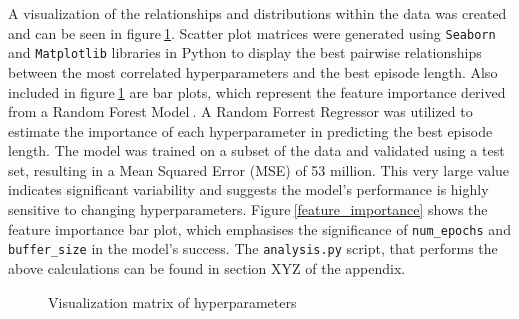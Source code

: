 A visualization of the relationships and distributions within the data was created and can be seen in figure$~$\ref{vis_matrix}. Scatter plot matrices were generated using \texttt{Seaborn} and \texttt{Matplotlib} libraries in Python to display the best pairwise relationships between the most correlated hyperparameters and the best episode length. Also included in figure$~$\ref{vis_matrix} are bar plots, which represent the feature importance derived from a Random Forest Model$~$\cite{randomforrestM}. A Random Forrest Regressor was utilized to estimate the importance of each hyperparameter in predicting the best episode length. The model was trained on a subset of the data and validated using a test set, resulting in a Mean Squared Error (MSE) of 53 million. This very large value indicates significant variability and suggests the model's performance is highly sensitive to changing hyperparameters. Figure$~$\ref{feature_importance} shows the feature importance bar plot, which emphasises the significance of \texttt{num\_epochs} and \texttt{buffer\_size} in the model's success. The \texttt{analysis.py} script, that performs the above calculations can be found in section XYZ of the appendix.

\begin{figure}[!htb]
    \centering
    \caption{Visualization matrix of hyperparameters}\label{vis_matrix}
\end{figure}

